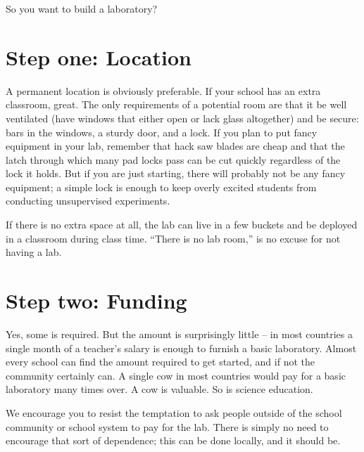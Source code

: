 So you want to build a laboratory?

\section{Step one: Location}
A permanent location is obviously preferable. 
If your school has an extra classroom, 
great. 
The only requirements of a potential room are 
that it be well ventilated 
(have windows that either open or lack glass altogether) 
and be secure: bars in the windows, 
a sturdy door, 
and a lock. 
If you plan to put fancy equipment in your lab, 
remember that hack saw blades are cheap 
and that the latch through which many pad locks pass 
can be cut quickly regardless of the lock it holds. 
But if you are just starting, 
there will probably not be any fancy equipment; 
a simple lock is enough to keep overly excited students 
from conducting unsupervised experiments.

If there is no extra space at all, 
the lab can live in a few buckets and be deployed in a classroom 
during class time. 
``There is no lab room,'' is no excuse for not having a lab.

\section{Step two: Funding}
Yes, 
some is required. 
But the amount is surprisingly little -- 
in most countries a single month of a teacher's salary 
is enough to furnish a basic laboratory. 
Almost every school can find the amount required to get started, 
and if not the community certainly can. 
A single cow in most countries would pay 
for a basic laboratory many times over. 
A cow is valuable. 
So is science education.

We encourage you to resist the temptation 
to ask people outside of the school community or school system 
to pay for the lab. 
There is simply no need to encourage that sort of dependence; 
this can be done locally, and it should be.

